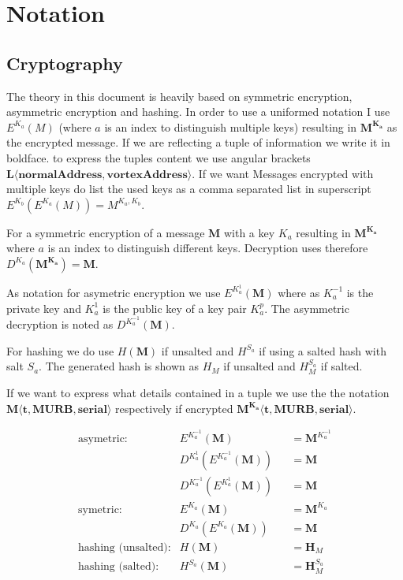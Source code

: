 \section{Notation}
\subsection{Cryptography \label{sec:encNot}}
The theory in this document is heavily based on symmetric encryption, asymmetric encryption and hashing. In order to use a uniformed notation I use $E^{K_a}(M)$ (where $a$ is an index to distinguish multiple keys) resulting in $\mathbf{M^{K_a}}$ as the encrypted message. If we are reflecting a tuple of information we write it in boldface. to express the tuples content we use angular brackets $\mathbf{L\langle normalAddress,vortexAddress\rangle }$. If we want Messages encrypted with multiple keys do list the used keys as a comma separated list in superscript $E^{K_b}\left(E^{K_a}\left(M\right)\right)=M^{{K_{a}},{K_b}}$.

For a symmetric encryption of a message $\mathbf{M}$ with a key $K_a$ resulting in $\mathbf{M^{K_a}}$ where $a$ is an index to distinguish different keys. Decryption uses therefore $D^{K_a}(\mathbf{M^{K_a}})=\mathbf{M}$.

As notation for asymetric encryption we use $E^{K^{1}_a}(\mathbf{M})$ where as $K^{-1}_a$ is the private key and $K^{1}_a$ is the public key of a key pair $K^p_a$. The asymmetric decryption is noted as $D^{K^{-1}_a}(\mathbf{M})$.

For hashing we do use $H(\mathbf{M})$ if unsalted and $H^{S_a}$ if using a salted hash with salt $S_a$. The generated hash is shown as $H_M$ if unsalted and $H^{S_a}_M$ if salted.

If we want to express what details contained in a tuple we use the the notation $\mathbf{M\langle t,MURB,serial\rangle }$ respectively if encrypted $\mathbf{M^{K_{a}}\langle t,MURB,serial\rangle}$.

\begin{align*}
\text{asymetric:}         & E^{K^{-1}_a}\left(\mathbf{M}\right)                        	&& =\mathbf{M}^{K^{-1}_a}\\
                          & D^{K^{1}_a}\left(E^{K^{-1}_a}\left(\mathbf{M}\right)\right)	&& =\mathbf{M}\\
                          & D^{K^{-1}_a}\left(E^{K^{1}_a}\left(\mathbf{M}\right)\right)	&& =\mathbf{M}\\
\text{symetric:}          & E^{K_a}\left(\mathbf{M}\right)                             	&& =\mathbf{M}^{K_a}\\
      		              & D^{K_a}\left(E^{K_a}\left(\mathbf{M}\right)\right)          && =\mathbf{M}\\
\text{hashing (unsalted):}& H\left(\mathbf{M}\right)                                   	&& =\mathbf{H}_M\\
\text{hashing (salted):}  & H^{S_a}\left(\mathbf{M}\right)                             	&& =\mathbf{H}^{S_a}_M
\end{align*}

